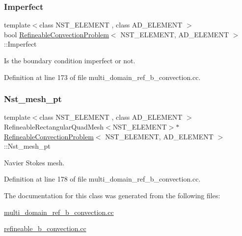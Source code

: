\subsubsection{\texorpdfstring{Imperfect}{Imperfect}}
{\footnotesize\ttfamily template$<$class N\+S\+T\+\_\+\+E\+L\+E\+M\+E\+NT , class A\+D\+\_\+\+E\+L\+E\+M\+E\+NT $>$ \\
bool \hyperlink{classRefineableConvectionProblem}{Refineable\+Convection\+Problem}$<$ N\+S\+T\+\_\+\+E\+L\+E\+M\+E\+NT, A\+D\+\_\+\+E\+L\+E\+M\+E\+NT $>$\+::Imperfect\hspace{0.3cm}{\ttfamily [private]}}



Is the boundary condition imperfect or not. 



Definition at line 173 of file multi\+\_\+domain\+\_\+ref\+\_\+b\+\_\+convection.\+cc.

\mbox{\label{classRefineableConvectionProblem_abc03f2233894203f55be5841857d2381}} 
\subsubsection{\texorpdfstring{Nst\+\_\+mesh\+\_\+pt}{Nst\_mesh\_pt}}
{\footnotesize\ttfamily template$<$class N\+S\+T\+\_\+\+E\+L\+E\+M\+E\+NT , class A\+D\+\_\+\+E\+L\+E\+M\+E\+NT $>$ \\
Refineable\+Rectangular\+Quad\+Mesh$<$N\+S\+T\+\_\+\+E\+L\+E\+M\+E\+NT$>$$\ast$ \hyperlink{classRefineableConvectionProblem}{Refineable\+Convection\+Problem}$<$ N\+S\+T\+\_\+\+E\+L\+E\+M\+E\+NT, A\+D\+\_\+\+E\+L\+E\+M\+E\+NT $>$\+::Nst\+\_\+mesh\+\_\+pt\hspace{0.3cm}{\ttfamily [protected]}}



Navier Stokes mesh. 



Definition at line 178 of file multi\+\_\+domain\+\_\+ref\+\_\+b\+\_\+convection.\+cc.



The documentation for this class was generated from the following files\+:\begin{DoxyCompactItemize}
\item 
\hyperlink{multi__domain__ref__b__convection_8cc}{multi\+\_\+domain\+\_\+ref\+\_\+b\+\_\+convection.\+cc}\item 
\hyperlink{refineable__b__convection_8cc}{refineable\+\_\+b\+\_\+convection.\+cc}\end{DoxyCompactItemize}
